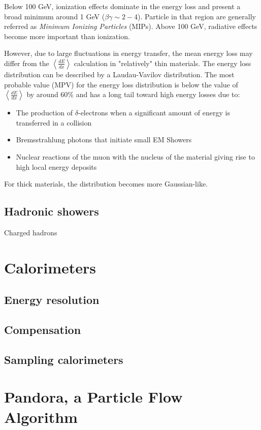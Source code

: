 Below 100 GeV, ionization effects dominate in the energy loss and present a broad minimum around 1 GeV ($\beta\gamma \sim 2-4$). Particle in that region are generally referred as \textit{Minimum Ionizing Particles} (MIPs). Above 100 GeV, radiative effects become more important than ionization.

However, due to large fluctuations in energy transfer, the mean energy loss may differ from the $\left<\frac{dE}{dx}\right>$ calculation in "relatively" thin materials. The energy loss distribution can be described by a Laudau-Vavilov distribution. The most probable value (MPV) for the energy loss distribution is below the value of $\left<\frac{dE}{dx}\right>$ by around 60\% and has a long tail toward high energy losses due to:
\begin{itemize}
  \item The production of $\delta$-electrons when a significant amount of energy is transferred in a collision
  \item Bremsstrahlung photons that initiate small EM Showers
  \item Nuclear reactions of the muon with the nucleus of the material giving rise to high local energy deposits
\end{itemize}
For thick materials, the distribution becomes more Gaussian-like.

\subsection{Hadronic showers}

Charged hadrons

\section{Calorimeters}

\subsection{Energy resolution}

\subsection{Compensation}

\subsection{Sampling calorimeters}

\section{Pandora, a Particle Flow Algorithm}
\label{sec:PFA}

